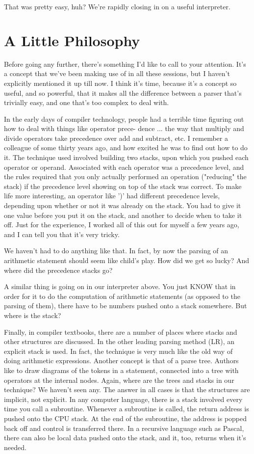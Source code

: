 \documentclass[float=false, crop=false]{standalone}
\begin{document}
That was pretty easy, huh? We're rapidly closing in on a useful interpreter.

\section{A Little Philosophy}

Before going any further, there's something I'd like to call to your attention.
It's a concept that we've been making use of in all these sessions, but I
haven't explicitly mentioned it up till now. I think it's time, because it's a
concept so useful, and so powerful, that it makes all the difference between a
parser that's trivially easy, and one that's too complex to deal with.

In the early days of compiler technology, people had a terrible time figuring
out how to deal with things like operator prece- dence ... the way that multiply
and divide operators take precedence over add and subtract, etc. I remember a
colleague of some thirty years ago, and how excited he was to find out how to do
it. The technique used involved building two stacks, upon which you pushed each
operator or operand. Associated with each operator was a precedence level, and
the rules required that you only actually performed an operation ("reducing" the
stack) if the precedence level showing on top of the stack was correct. To make
life more interesting, an operator like ')' had different precedence levels,
depending upon whether or not it was already on the stack. You had to give it
one value before you put it on the stack, and another to decide when to take it
off. Just for the experience, I worked all of this out for myself a few years
ago, and I can tell you that it's very tricky.

We haven't had to do anything like that. In fact, by now the parsing of an
arithmetic statement should seem like child's play. How did we get so lucky? And
where did the precedence stacks go?

A similar thing is going on in our interpreter above. You just KNOW that in
order for it to do the computation of arithmetic statements (as opposed to the
parsing of them), there have to be numbers pushed onto a stack somewhere. But
where is the stack?

Finally, in compiler textbooks, there are a number of places where stacks and
other structures are discussed. In the other leading parsing method (LR), an
explicit stack is used. In fact, the technique is very much like the old way of
doing arithmetic expressions. Another concept is that of a parse tree. Authors
like to draw diagrams of the tokens in a statement, connected into a tree with
operators at the internal nodes. Again, where are the trees and stacks in our
technique? We haven't seen any. The answer in all cases is that the structures
are implicit, not explicit. In any computer language, there is a stack involved
every time you call a subroutine. Whenever a subroutine is called, the return
address is pushed onto the CPU stack. At the end of the subroutine, the address
is popped back off and control is transferred there. In a recursive language
such as Pascal, there can also be local data pushed onto the stack, and it, too,
returns when it's needed.
\end{document}

